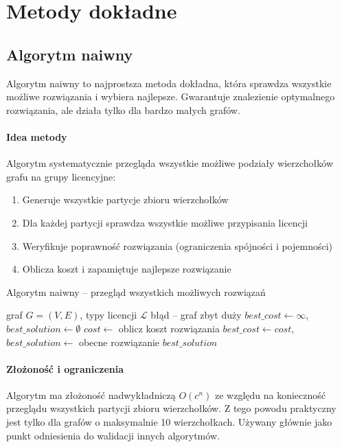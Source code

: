 \section{Metody dokładne}

\subsection{Algorytm naiwny}

Algorytm naiwny to najprostsza metoda dokładna, która sprawdza wszystkie możliwe rozwiązania i wybiera najlepsze. Gwarantuje znalezienie optymalnego rozwiązania, ale działa tylko dla bardzo małych grafów.

\paragraph{Idea metody}
Algorytm systematycznie przegląda wszystkie możliwe podziały wierzchołków grafu na grupy licencyjne:
\begin{enumerate}
  \item Generuje wszystkie partycje zbioru wierzchołków
  \item Dla każdej partycji sprawdza wszystkie możliwe przypisania licencji
  \item Weryfikuje poprawność rozwiązania (ograniczenia spójności i pojemności)
  \item Oblicza koszt i zapamiętuje najlepsze rozwiązanie
\end{enumerate}

\begin{algorithm}[H]
\caption{Algorytm naiwny -- przegląd wszystkich możliwych rozwiązań}
\label{alg:naive}
\begin{algorithmic}[1]
\Require graf $G=(V,E)$, typy licencji $\mathcal{L}$
 \State \Return błąd -- graf zbyt duży \EndIf
\State $best\_cost \gets \infty$, $best\_solution \gets \emptyset$
      \State $cost \gets$ oblicz koszt rozwiązania
        \State $best\_cost \gets cost$, $best\_solution \gets$ obecne rozwiązanie
      \EndIf
    \EndIf
  \EndFor
\EndFor
\State \Return $best\_solution$
\end{algorithmic}
\end{algorithm}

\paragraph{Złożoność i ograniczenia}
Algorytm ma złożoność nadwykładniczą $O(c^n)$ ze względu na konieczność przeglądu wszystkich partycji zbioru wierzchołków. Z tego powodu praktyczny jest tylko dla grafów o maksymalnie 10 wierzchołkach. Używany głównie jako punkt odniesienia do walidacji innych algorytmów.


